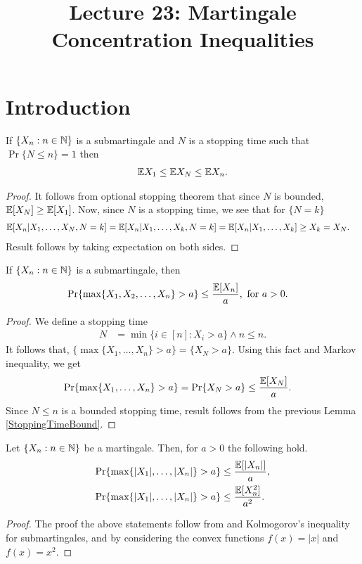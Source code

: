 \documentclass[a4paper,10pt,english]{article}
\title{Lecture 23: Martingale Concentration Inequalities}
\author{}
\begin{document}
\maketitle
\section{Introduction}

\begin{lem}
\label{StoppingTimeBound}
If $\{X_n: n \in \mathbb{N} \}$ is  a submartingale and $N$ is a stopping time such that $\Pr\{N \leq n\}=1$ then
\begin{align*}
 \mathbb{E} X_1 \leq \mathbb{E} X_N \leq \mathbb{E} X_n.
\end{align*}
\end{lem}
\begin{proof}
It follows from optional stopping theorem that since $N$ is bounded, $\mathbb{E}[X_N] \geq \mathbb{E}[X_1]$. 
Now, since $N$ is a stopping time, we see that for $\{N = k\}$
\begin{align*}
\mathbb{E}[X_n|X_1, \ldots, X_N, N = k ]&= \mathbb{E}[X_n|X_1, \ldots, X_k, N=k] = \mathbb{E}[X_n|X_1, \ldots, X_k] \geq X_k = X_N.
\end{align*}
Result follows by taking expectation on both sides.
\end{proof}

\begin{thm} If $\{X_n: n \in \mathbb{N} \}$ is a submartingale, then
\begin{align*}
\Pr\{\max\{X_1,X_2, \ldots, X_n\}>a\} &\leq \frac{\mathbb{E}[X_n]}{a},\text{ for } a>0.
\end{align*}
\end{thm}
\begin{proof}
We define a stopping time 
\begin{align*}
N &= \min\{i \in [n]: X_i >a\} \wedge n \leq n.
\end{align*} %
It follows that, $\{\max\{X_1, \ldots, X_n\}>a\} = \{X_N > a\}$. 
Using this fact and Markov inequality, we get
\begin{align*}
\Pr\{\max\{X_1, \ldots, X_n\}>a\} &=\Pr\{X_N>a\} \leq \frac{\mathbb{E}[X_N]}{a}.
\end{align*}
Since $N \leq n$ is a bounded stopping time, result follows from the previous Lemma \ref{StoppingTimeBound}.
\end{proof}
\begin{cor}
\label{MartingaleBoundCor}
Let $\{X_n : n \in \mathbb{N} \}$ be a martingale. Then, for $a>0$ the following hold.
\begin{align*}
\Pr\{\max\{|X_1|, \ldots, |X_n|\}>a\} &\leq \frac{\mathbb{E}[|X_n|]}{a},\\
\Pr\{\max\{|X_1|, \ldots, |X_n|\}>a\} &\leq \frac{\mathbb{E}[X_n^2]}{a^2}.
\end{align*}
\end{cor}
\begin{proof}
The proof the above statements follow from and Kolmogorov's inequality for submartingales, and by considering the convex functions $f(x)=|x|$ and $f(x)=x^2$. 
\end{proof}
\end{document}
